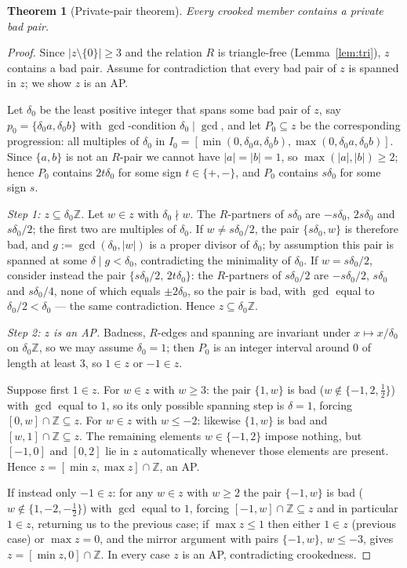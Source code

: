 \documentclass[10pt,a4paper]{amsart}
\newtheorem{theorem}{Theorem}
\newcommand{\Z}{\mathbb{Z}}
\begin{document}
\begin{theorem}[Private-pair theorem]\label{thm:private}
Every crooked member contains a private bad pair.
\end{theorem}

\begin{proof}
Since $|z\setminus\{0\}|\ge 3$ and the relation $R$ is triangle-free (Lemma~\ref{lem:tri}), $z$ contains a bad pair. Assume for contradiction that every bad pair of $z$ is spanned in $z$; we show $z$ is an AP.

Let $\delta_0$ be the least positive integer that spans some bad pair of $z$, say $p_0=\{\delta_0 a,\delta_0 b\}$ with $\gcd$-condition $\delta_0\mid\gcd$, and let $P_0\subseteq z$ be the corresponding progression: all multiples of $\delta_0$ in $I_0=[\min(0,\delta_0a,\delta_0b),\max(0,\delta_0a,\delta_0b)]$. Since $\{a,b\}$ is not an $R$-pair we cannot have $|a|=|b|=1$, so $\max(|a|,|b|)\ge2$; hence $P_0$ contains $2t\delta_0$ for some sign $t\in\{+,-\}$, and $P_0$ contains $s\delta_0$ for some sign $s$.

\emph{Step 1: $z\subseteq\delta_0\mathbb{Z}$.} Let $w\in z$ with $\delta_0\nmid w$. The $R$-partners of $s\delta_0$ are $-s\delta_0$, $2s\delta_0$ and $s\delta_0/2$; the first two are multiples of $\delta_0$. If $w\neq s\delta_0/2$, the pair $\{s\delta_0,w\}$ is therefore bad, and $g:=\gcd(\delta_0,|w|)$ is a proper divisor of $\delta_0$; by assumption this pair is spanned at some $\delta\mid g<\delta_0$, contradicting the minimality of $\delta_0$. If $w=s\delta_0/2$, consider instead the pair $\{s\delta_0/2,\,2t\delta_0\}$: the $R$-partners of $s\delta_0/2$ are $-s\delta_0/2$, $s\delta_0$ and $s\delta_0/4$, none of which equals $\pm2\delta_0$, so the pair is bad, with $\gcd$ equal to $\delta_0/2<\delta_0$ --- the same contradiction. Hence $z\subseteq\delta_0\mathbb{Z}$.

\emph{Step 2: $z$ is an AP.} Badness, $R$-edges and spanning are invariant under $x\mapsto x/\delta_0$ on $\delta_0\mathbb{Z}$, so we may assume $\delta_0=1$; then $P_0$ is an integer interval around $0$ of length at least $3$, so $1\in z$ or $-1\in z$.

Suppose first $1\in z$. For $w\in z$ with $w\ge3$: the pair $\{1,w\}$ is bad ($w\notin\{-1,2,\tfrac12\}$) with $\gcd$ equal to $1$, so its only possible spanning step is $\delta=1$, forcing $[0,w]\cap\Z\subseteq z$. For $w\in z$ with $w\le-2$: likewise $\{1,w\}$ is bad and $[w,1]\cap\Z\subseteq z$. The remaining elements $w\in\{-1,2\}$ impose nothing, but $[-1,0]$ and $[0,2]$ lie in $z$ automatically whenever those elements are present. Hence $z=[\min z,\max z]\cap\Z$, an AP.

If instead only $-1\in z$: for any $w\in z$ with $w\ge 2$ the pair $\{-1,w\}$ is bad ($w\notin\{1,-2,-\tfrac12\}$) with $\gcd$ equal to $1$, forcing $[-1,w]\cap\Z\subseteq z$ and in particular $1\in z$, returning us to the previous case; if $\max z\le 1$ then either $1\in z$ (previous case) or $\max z=0$, and the mirror argument with pairs $\{-1,w\}$, $w\le-3$, gives $z=[\min z,0]\cap\Z$. In every case $z$ is an AP, contradicting crookedness.
\end{proof}
\end{document}
